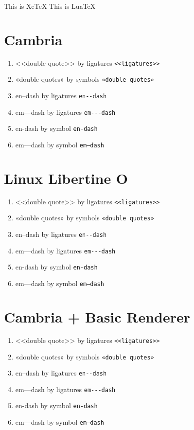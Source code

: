 \documentclass{article}
\begin{document}
\ifxetex
    This is XeTeX
\else\ifluatex
    This is LuaTeX

\fi\fi

\section{Cambria}

\begin{enumerate}
    \item <<double quote>> by ligatures \verb|<<ligatures>>|
    \item «double quotes» by symbols \verb|«double quotes»|
    \item en--dash by ligatures \verb|en--dash|
    \item em---dash by ligatures \verb|em---dash|
    \item en-dash by symbol \verb|en-dash|
    \item em—dash by symbol \verb|em—dash|
\end{enumerate}

\section{Linux Libertine O}
\selectfont
\begin{enumerate}
    \item <<double quote>> by ligatures \verb|<<ligatures>>|
    \item «double quotes» by symbols \verb|«double quotes»|
    \item en--dash by ligatures \verb|en--dash|
    \item em---dash by ligatures \verb|em---dash|
    \item en-dash by symbol \verb|en-dash|
    \item em—dash by symbol \verb|em—dash|
\end{enumerate}

\section{Cambria + Basic Renderer}
\selectfont
\begin{enumerate}
    \item <<double quote>> by ligatures \verb|<<ligatures>>|
    \item «double quotes» by symbols \verb|«double quotes»|
    \item en--dash by ligatures \verb|en--dash|
    \item em---dash by ligatures \verb|em---dash|
    \item en-dash by symbol \verb|en-dash|
    \item em—dash by symbol \verb|em—dash|
\end{enumerate}
\end{document}
